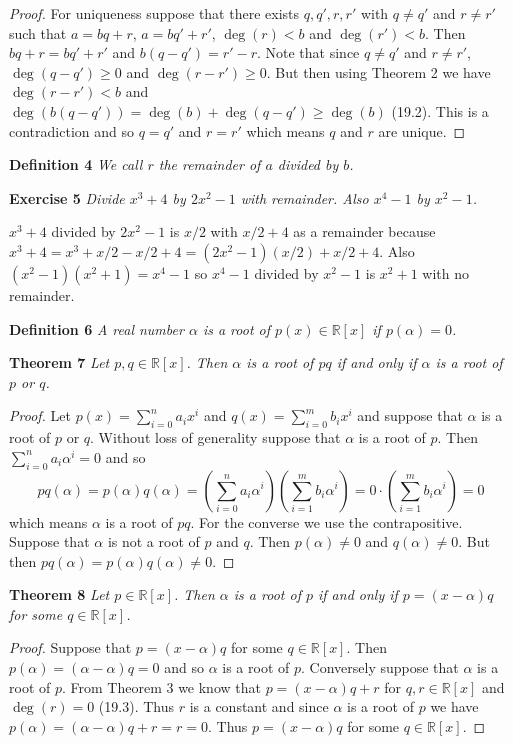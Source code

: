 \documentclass{article}
\begin{document}
\begin{flushleft}
\begin{proof}
For uniqueness suppose that there exists $q,q',r,r'$ with $q \neq q'$ and $r \neq r'$ such that $a=bq+r$, $a=bq'+r'$, $\deg(r) < b$ and $\deg(r') < b$. Then $bq+r = bq'+r'$ and $b(q-q') = r'-r$. Note that since $q \neq q'$ and $r \neq r'$, $\deg(q-q') \geq 0$ and $\deg(r-r') \geq 0$. But then using Theorem 2 we have $\deg(r-r') < b$ and $\deg(b(q-q')) = \deg(b) + \deg(q-q') \geq \deg(b)$ (19.2). This is a contradiction and so $q=q'$ and $r=r'$ which means $q$ and $r$ are unique.
\end{proof}

\textbf{Definition 4}
\textsl{We call $r$ the remainder of $a$ divided by $b$.}\newline

\textbf{Exercise 5}
\textsl{Divide $x^3 + 4$ by $2x^2 - 1$ with remainder. Also $x^4-1$ by $x^2 - 1$.}\newline

$x^3+4$ divided by $2x^2-1$ is $x/2$ with $x/2+4$ as a remainder because $x^3+4 = x^3 + x/2 - x/2 + 4 = (2x^2-1)(x/2) + x/2+4$. Also $(x^2-1)(x^2+1) = x^4-1$ so $x^4-1$ divided by $x^2-1$ is $x^2+1$ with no remainder.\newline

\textbf{Definition 6}
\textsl{A real number $\alpha$ is a root of $p(x) \in \mathbb{R}[x]$ if $p(\alpha) = 0$.}\newline

\textbf{Theorem 7}
\textsl{Let $p,q \in \mathbb{R}[x]$. Then $\alpha$ is a root of $pq$ if and only if $\alpha$ is a root of $p$ or $q$.}
\begin{proof}
Let $p(x) = \sum_{i=0}^n a_i x^i$ and $q(x) = \sum_{i=0}^m b_i x^i$ and suppose that $\alpha$ is a root of $p$ or $q$. Without loss of generality suppose that $\alpha$ is a root of $p$. Then $\sum_{i=0}^n a_i \alpha^i = 0$ and so
\[
pq(\alpha) = p(\alpha) q(\alpha) = \left ( \sum_{i=0}^n a_i \alpha^i \right ) \left( \sum_{i=1}^m b_i \alpha^i \right ) = 0 \cdot \left ( \sum_{i=1}^m b_i \alpha^i \right ) = 0
\]
which means $\alpha$ is a root of $pq$. For the converse we use the contrapositive. Suppose that $\alpha$ is not a root of $p$ and $q$. Then $p(\alpha) \neq 0$ and $q(\alpha) \neq 0$. But then $pq(\alpha) = p(\alpha) q(\alpha) \neq 0$.
\end{proof}

\textbf{Theorem 8}
\textsl{Let $p \in \mathbb{R}[x]$. Then $\alpha$ is a root of $p$ if and only if $p = (x-\alpha)q$ for some $q \in \mathbb{R}[x]$.}
\begin{proof}
Suppose that $p = (x - \alpha)q$ for some $q \in \mathbb{R}[x]$. Then $p(\alpha) = (\alpha-\alpha)q = 0$ and so $\alpha$ is a root of $p$. Conversely suppose that $\alpha$ is a root of $p$. From Theorem 3 we know that $p = (x-\alpha)q + r$ for $q,r \in \mathbb{R}[x]$ and $\deg (r) = 0$ (19.3). Thus $r$ is a constant and since $\alpha$ is a root of $p$ we have $p(\alpha) = (\alpha - \alpha)q + r = r = 0$. Thus $p = (x-\alpha)q$ for some $q \in \mathbb{R}[x]$.
\end{proof}


\end{flushleft}
\end{document}
